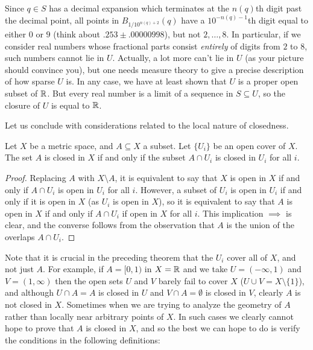 Since \(q\in S\) has a decimal expansion which terminates at the \(n(q)\)th
digit past the decimal point, all points in \(B_{1/10^{n(q)+2}}(q)\) have a
\(10^{-n(q)-1}\)th digit equal to either \(0\) or \(9\) (think about
\(.253\pm.00000998\)), but not \(2,\dotsc,8\). In particular, if we
consider real numbers whose fractional parts consist \emph{entirely} of
digits from \(2\) to \(8\), such numbers cannot lie in \(U\). Actually, a
lot more can't lie in \(U\) (as your picture should convince you), but one
needs measure theory to give a precise description of how sparse \(U\)
is. In any case, we have at least shown that \(U\) is a proper open subset
of \(\mathbb{R}\). But every real number is a limit of a sequence in \(S\subseteq
U\), so the closure of \(U\) is equal to \(\mathbb{R}\).

Let us conclude with considerations related to the local nature of closedness.

\begin{theorem}
  Let \(X\) be a metric space, and \(A\subseteq X\) a subset. Let
  \(\{U_i\}\) be an open cover of \(X\). The set \(A\) is closed in \(X\)
  if and only if the subset \(A\cap U_i\) is closed in \(U_i\) for all
  \(i\).
\end{theorem}
\begin{proof}
  Replacing \(A\) with \(X\setminus A\), it is equivalent to say that \(X\)
  is open in \(X\) if and only if \(A\cap U_i\) is open in \(U_i\) for all
  \(i\). However, a subset of \(U_i\) is open in \(U_i\) if and only if it
  is open in \(X\) (as \(U_i\) is open in \(X\)), so it is equivalent to
  say that \(A\) is open in \(X\) if and only if \(A\cap U_i\) if open in
  \(X\) for all \(i\). This implication \(\implies\) is clear, and the
  converse follows from the observation that \(A\) is the union of the
  overlaps \(A\cap U_i\).
\end{proof}

Note that it is crucial in the preceding theorem that the \(U_i\) cover all
of \(X\), and not just \(A\). For example, if \(A=[0,1)\) in \(X=\mathbb{R}\) and
we take \(U=(-\infty,1)\) and \(V=(1,\infty)\) then the open sets \(U\) and
\(V\) barely fail to cover \(X\) (\(U\cup V=X\setminus\{1\}\)), and
although \(U\cap A=A\) is closed in \(U\) and \(V\cap A=\emptyset\) is
closed in \(V\), clearly \(A\) is not closed in \(X\). Sometimes when we
are trying to analyze the geometry of \(A\) rather than locally near
arbitrary points of \(X\). In such cases we clearly cannot hope to prove
that \(A\) is closed in \(X\), and so the best we can hope to do is verify
the conditions in the following definitions:

